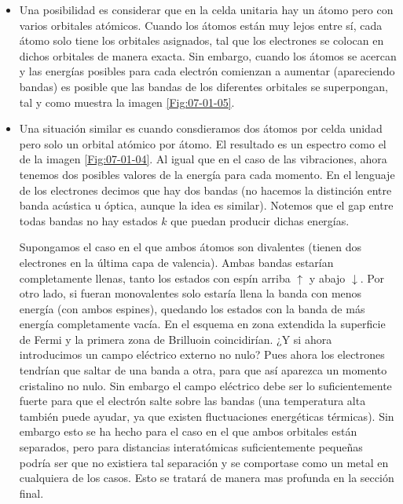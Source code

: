 \begin{itemize}
	\item Una posibilidad es considerar que en la celda unitaria hay un átomo pero con varios orbitales atómicos. Cuando los átomos están muy lejos entre sí, cada átomo solo tiene los orbitales asignados, tal que los electrones se colocan en dichos orbitales de manera exacta. Sin embargo, cuando los átomos se acercan y las energías posibles para cada electrón comienzan a aumentar (apareciendo bandas) es posible que las bandas de los diferentes orbitales se superpongan, tal y como muestra la imagen \ref{Fig:07-01-05}.
	\item Una situación similar es cuando consdieramos dos átomos por celda unidad pero solo un orbital atómico por átomo. El resultado es un espectro como el de la imagen \ref{Fig:07-01-04}. Al igual que en el caso de las vibraciones, ahora tenemos dos posibles valores de la energía para cada momento. En el lenguaje de los electrones decimos que hay dos bandas (no hacemos la distinción entre banda acústica u óptica, aunque la idea es similar). Notemos que el gap entre todas bandas no hay estados $k$ que puedan producir dichas energías.
	
	Supongamos el caso en el que ambos átomos son divalentes (tienen dos electrones en la última capa de valencia). Ambas bandas estarían completamente llenas, tanto los estados con espín arriba $\uparrow$ y abajo $\downarrow$. Por otro lado, si fueran monovalentes solo estaría llena la banda con menos energía (con ambos espines), quedando los estados con la banda de más energía completamente vacía. En el esquema en zona extendida la superficie de Fermi y la primera zona de Brilluoin coincidirían. ¿Y si ahora introducimos un campo eléctrico externo no nulo? Pues ahora los electrones tendrían que saltar de una banda a otra, para que así aparezca un momento cristalino no nulo. Sin embargo el campo eléctrico debe ser lo suficientemente fuerte para que el electrón salte sobre las bandas (una temperatura alta también puede ayudar, ya que existen fluctuaciones energéticas térmicas). Sin embargo esto se ha hecho para el caso en el que ambos orbitales están separados, pero para distancias interatómicas suficientemente pequeñas podría ser que no existiera tal separación y se comportase como un metal en cualquiera de los casos. Esto se tratará de manera mas profunda en la sección final.
\end{itemize}


